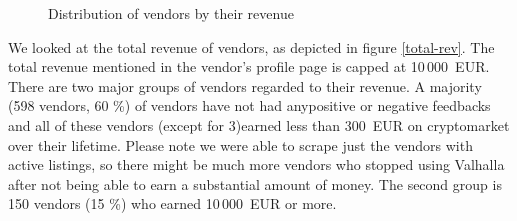 \documentclass[
  digital, %
  table,   %
  lof,     %
  lot,     %
  oneside
]{fithesis3}
\begin{document}
\begin{figure}[!htb]

    
\caption{Distribution of vendors by their revenue}
\label{total-rev}
\label{posratrev}
\end{figure}

We looked at the total revenue of vendors, as depicted in figure \ref{total-rev}. 
The total revenue mentioned in the vendor's profile page is capped at 10\,000~EUR.
There are two major groups of vendors regarded to their revenue. 
A majority (598 vendors, 60 \%) of vendors have not had any\newline positive or negative feedbacks and all of these vendors
(except for 3)\newline earned less than 300~EUR on cryptomarket over their lifetime.
Please note we were able to scrape just the vendors with active listings,
so there might be much more vendors who stopped using Valhalla after
not being able to earn a substantial amount of money.
The second group is 150 vendors (15 \%) who earned 10\,000~EUR or more.
\end{document}
